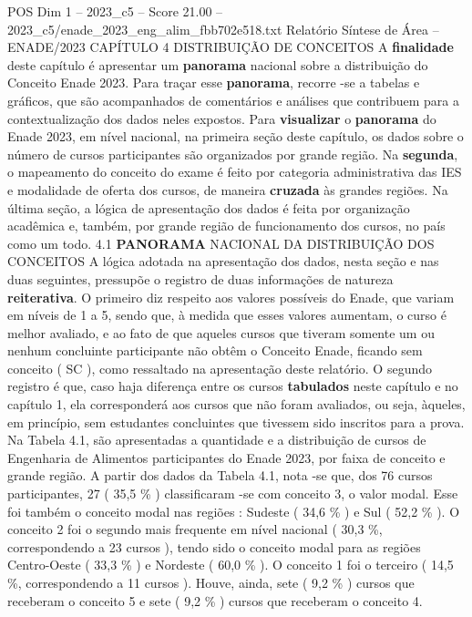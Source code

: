 \begin{textsample}{POS Dim 1 – 2023\_c5 – Score 21.00 – 2023\_c5/enade\_2023\_eng\_alim\_fbb702e518.txt}  \label{ex:f1_pos_015}
Relatório Síntese de Área – ENADE/2023 CAPÍTULO 4 DISTRIBUIÇÃO DE CONCEITOS A \textbf{finalidade} deste capítulo é apresentar um \textbf{panorama} nacional sobre a distribuição do Conceito Enade 2023.
Para traçar esse \textbf{panorama}, recorre -se a tabelas e gráficos, que são acompanhados de comentários e análises que contribuem para a contextualização dos dados neles expostos.
Para \textbf{visualizar} o \textbf{panorama} do Enade 2023, em nível nacional, na primeira seção deste capítulo, os dados sobre o número de cursos participantes são organizados por grande região.
Na \textbf{segunda}, o mapeamento do conceito do exame é feito por categoria administrativa das IES e modalidade de oferta dos cursos, de maneira \textbf{cruzada} às grandes regiões.
Na última seção, a lógica de apresentação dos dados é feita por organização acadêmica e, também, por grande região de funcionamento dos cursos, no país como um todo. 4.1 \textbf{PANORAMA} NACIONAL DA DISTRIBUIÇÃO DOS CONCEITOS A lógica adotada na apresentação dos dados, nesta seção e nas duas seguintes, pressupõe o registro de duas informações de natureza \textbf{reiterativa}.
O primeiro diz respeito aos valores possíveis do Enade, que variam em níveis de 1 a 5, sendo que, à medida que esses valores aumentam, o curso é melhor avaliado, e ao fato de que aqueles cursos que tiveram somente um ou nenhum concluinte participante não obtêm o Conceito Enade, ficando sem conceito ( SC ), como ressaltado na apresentação deste relatório.
O segundo registro é que, caso haja diferença entre os cursos \textbf{tabulados} neste capítulo e no capítulo 1, ela corresponderá aos cursos que não foram avaliados, ou seja, àqueles, em princípio, sem estudantes concluintes que tivessem sido inscritos para a prova.
Na Tabela 4.1, são apresentadas a quantidade e a distribuição de cursos de Engenharia de Alimentos participantes do Enade 2023, por faixa de conceito e grande região.
A partir dos dados da Tabela 4.1, nota -se que, dos 76 cursos participantes, 27 ( 35,5 \% ) classificaram -se com conceito 3, o valor modal.
Esse foi também o conceito modal nas regiões : Sudeste ( 34,6 \% ) e Sul ( 52,2 \% ).
O conceito 2 foi o segundo mais frequente em nível nacional ( 30,3 \%, correspondendo a 23 cursos ), tendo sido o conceito modal para as regiões Centro-Oeste ( 33,3 \% ) e Nordeste ( 60,0 \% ).
O conceito 1 foi o terceiro ( 14,5 \%, correspondendo a 11 cursos ).
Houve, ainda, sete ( 9,2 \% ) cursos que receberam o conceito 5 e sete ( 9,2 \% ) cursos que receberam o conceito 4.

\end{textsample}
